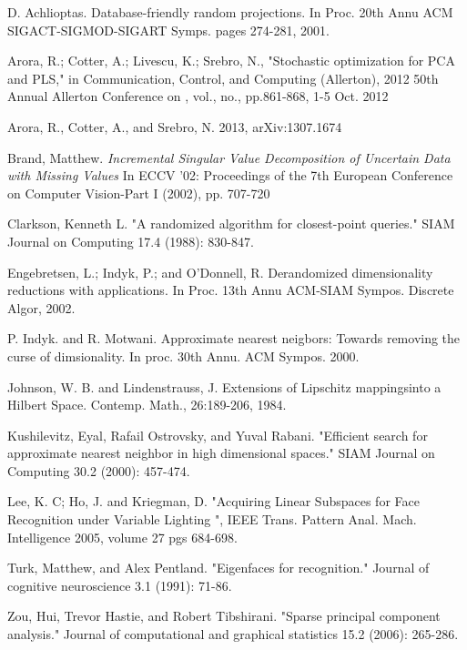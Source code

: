 \documentclass[11pt,letterpaper]{article}
\begin{document}
\begin{thebibliography}{20}


  D. Achlioptas. Database-friendly random projections. In Proc. 20th Annu ACM SIGACT-SIGMOD-SIGART Symps. pages 274-281, 2001. 
  
  Arora, R.; Cotter, A.; Livescu, K.; Srebro, N., "Stochastic optimization for PCA and PLS," in Communication, Control, and Computing (Allerton), 2012 50th Annual Allerton Conference on , vol., no., pp.861-868, 1-5 Oct. 2012
  
   Arora, R., Cotter, A., and Srebro, N. 2013, arXiv:1307.1674 
  
  Brand, Matthew. {\em Incremental Singular Value Decomposition of Uncertain Data with Missing Values} In ECCV '02: Proceedings of the 7th European Conference on Computer Vision-Part I (2002), pp. 707-720
  
  Clarkson, Kenneth L. "A randomized algorithm for closest-point queries." SIAM Journal on Computing 17.4 (1988): 830-847.
  
  Engebretsen, L.; Indyk, P.; and O'Donnell, R. Derandomized dimensionality reductions with applications. In Proc. 13th Annu ACM-SIAM Sympos. Discrete Algor, 2002. 
  
    P. Indyk. and R. Motwani. Approximate nearest neigbors: Towards removing the curse of dimsionality. In proc. 30th Annu. ACM Sympos. 2000.
  
  Johnson, W. B. and Lindenstrauss, J. Extensions of Lipschitz mappingsinto a Hilbert Space. Contemp. Math., 26:189-206, 1984.
  
  Kushilevitz, Eyal, Rafail Ostrovsky, and Yuval Rabani. "Efficient search for approximate nearest neighbor in high dimensional spaces." SIAM Journal on Computing 30.2 (2000): 457-474.
 
 Lee, K. C; Ho, J. and Kriegman, D. "Acquiring Linear Subspaces for Face Recognition under Variable Lighting ", IEEE Trans. Pattern Anal. Mach. Intelligence 2005, volume 27 pgs 684-698.  
 
 Turk, Matthew, and Alex Pentland. "Eigenfaces for recognition." Journal of cognitive neuroscience 3.1 (1991): 71-86.
  
  Zou, Hui, Trevor Hastie, and Robert Tibshirani. "Sparse principal component analysis." Journal of computational and graphical statistics 15.2 (2006): 265-286.
  
  \end{thebibliography}
\end{document}
